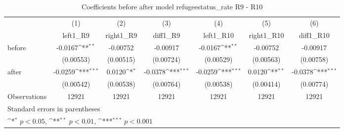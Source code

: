 \begin{table}[!ht]\centering \footnotesize
\def\sym#1{\ifmmode^{#1}\else\(^{#1}\)\fi}
\caption{Coefficients before after model refugeestatus\_rate R9 - R10}
\begin{tabular}{l*{6}{c}}
\hline\hline
                    &\multicolumn{1}{c}{(1)}&\multicolumn{1}{c}{(2)}&\multicolumn{1}{c}{(3)}&\multicolumn{1}{c}{(4)}&\multicolumn{1}{c}{(5)}&\multicolumn{1}{c}{(6)}\\
                    &\multicolumn{1}{c}{left1\_R9}&\multicolumn{1}{c}{right1\_R9}&\multicolumn{1}{c}{diff1\_R9}&\multicolumn{1}{c}{left1\_R10}&\multicolumn{1}{c}{right1\_R10}&\multicolumn{1}{c}{diff1\_R10}\\
\hline
before              &     -0.0167\sym{**} &    -0.00752         &    -0.00917         &     -0.0167\sym{**} &    -0.00752         &    -0.00917         \\
                    &   (0.00553)         &   (0.00515)         &   (0.00724)         &   (0.00529)         &   (0.00563)         &   (0.00758)         \\
[1em]
after               &     -0.0259\sym{***}&      0.0120\sym{*}  &     -0.0378\sym{***}&     -0.0259\sym{***}&      0.0120\sym{**} &     -0.0378\sym{***}\\
                    &   (0.00542)         &   (0.00538)         &   (0.00764)         &   (0.00538)         &   (0.00414)         &   (0.00774)         \\
\hline
Observations        &       12921         &       12921         &       12921         &       12921         &       12921         &       12921         \\
\hline\hline
\multicolumn{7}{l}{\footnotesize Standard errors in parentheses}\\
\multicolumn{7}{l}{\footnotesize \sym{*} \(p<0.05\), \sym{**} \(p<0.01\), \sym{***} \(p<0.001\)}\\
\end{tabular}
\end{table}

